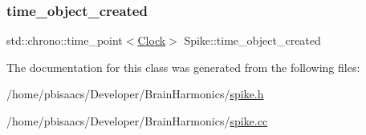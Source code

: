 \mbox{\label{classSpike_ae9e73c1745176138c2f2474c4dfdf89e}} 
\subsubsection{\texorpdfstring{time\+\_\+object\+\_\+created}{time\_object\_created}}
{\footnotesize\ttfamily std\+::chrono\+::time\+\_\+point$<$\mbox{\hyperlink{universe_8h_a0ef8d951d1ca5ab3cfaf7ab4c7a6fd80}{Clock}}$>$ Spike\+::time\+\_\+object\+\_\+created\hspace{0.3cm}{\ttfamily [private]}}



The documentation for this class was generated from the following files\+:\begin{DoxyCompactItemize}
\item 
/home/pbisaacs/\+Developer/\+Brain\+Harmonics/\mbox{\hyperlink{spike_8h}{spike.\+h}}\item 
/home/pbisaacs/\+Developer/\+Brain\+Harmonics/\mbox{\hyperlink{spike_8cc}{spike.\+cc}}\end{DoxyCompactItemize}
